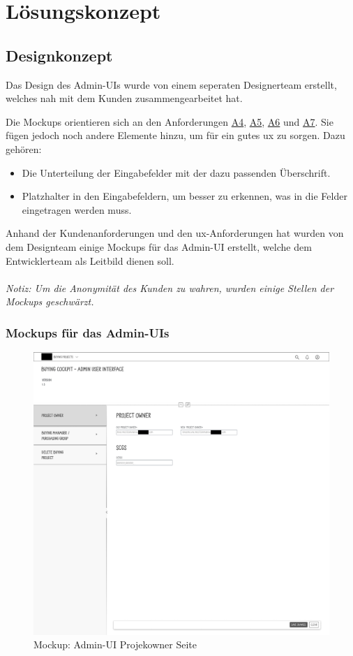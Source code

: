 \newpage
\section{Lösungskonzept}
\subsection[Designkonzept]{Designkonzept}
Das Design des Admin-UIs wurde von einem seperaten Designerteam erstellt, welches nah mit dem Kunden zusammengearbeitet hat.

Die Mockups orientieren sich an den Anforderungen \hyperref[Tab:A4]{A4}, \hyperref[Tab:A5]{A5}, \hyperref[Tab:A6]{A6} und \hyperref[Tab:A7]{A7}. Sie fügen jedoch noch andere Elemente hinzu, um für ein gutes \acs{ux} zu sorgen. Dazu gehören:
\begin{itemize}
    \item Die Unterteilung der Eingabefelder mit der dazu passenden Überschrift.
    \item Platzhalter in den Eingabefeldern, um besser zu erkennen, was in die Felder eingetragen werden muss.
\end{itemize}

Anhand der Kundenanforderungen und den \acs{ux}-Anforderungen hat wurden von dem Designteam einige Mockups für das Admin-UI erstellt, welche dem Entwicklerteam als Leitbild dienen soll. \\\\
\textit{Notiz: Um die Anonymität des Kunden zu wahren, wurden einige Stellen der Mockups geschwärzt.}

\subsubsection[short]{Mockups für das Admin-UIs}
\begin{figure}[H]
    \centering
    \includegraphics[width=\linewidth]{Images/Mockup_PO_anonym.png}
    \caption[Mockup: Admin-UI Projekowner Seite]{Mockup: Admin-UI Projekowner Seite}
\end{figure}

